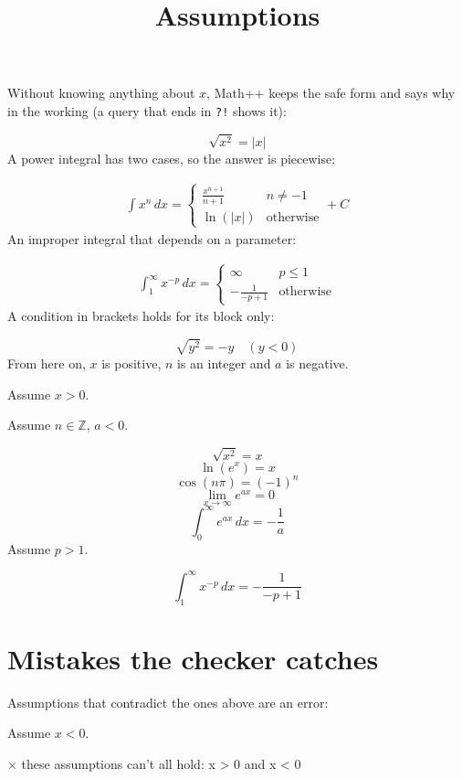 \documentclass[11pt,a4paper]{article}
\title{Assumptions}
\date{}
\theoremstyle{plain}
\theoremstyle{definition}
\theoremstyle{remark}
\begin{document}
\maketitle
Without knowing anything about $x$, Math++ keeps the safe form and says why in the working (a query that ends in \texttt{?!} shows it):

\begin{equation*}
  \sqrt{x^2} = \left|x\right|
\end{equation*}
A power integral has two cases, so the answer is piecewise:

\begin{align*}
  \int x^n \, dx = \begin{cases} \frac{x^{n + 1}}{n + 1} & n \neq -1 \\ \ln\left(\left|x\right|\right) & \text{otherwise} \end{cases} + C
\end{align*}
An improper integral that depends on a parameter:

\begin{align*}
  \int_1^\infty x^{-p} \, dx = \begin{cases} \infty & p \le 1 \\ -\frac{1}{-p + 1} & \text{otherwise} \end{cases}
\end{align*}
A condition in brackets holds for its block only:

\begin{equation*}
  \sqrt{y^2} = -y \quad (y < 0)
\end{equation*}
From here on, $x$ is positive, $n$ is an integer and $a$ is negative.

Assume $x > 0$.

Assume $n \in \mathbb{Z}$, $a < 0$.

\begin{equation*}
  \sqrt{x^2} = x
\end{equation*}
\begin{equation*}
  \ln(e^x) = x
\end{equation*}
\begin{equation*}
  \cos(n \pi) = \left(-1\right)^{n}
\end{equation*}
\begin{equation*}
  \lim_{x \to \infty} e^{a x} = 0
\end{equation*}
\begin{equation*}
  \int_0^\infty e^{a x} \, dx = -\frac{1}{a}
\end{equation*}
Assume $p > 1$.

\begin{equation*}
  \int_1^\infty x^{-p} \, dx = -\frac{1}{-p + 1}
\end{equation*}
\section*{Mistakes the checker catches}

Assumptions that contradict the ones above are an error:

Assume $x < 0$.

{\small\color{red!60!black}$\times$ these assumptions can't all hold: x > 0 and x < 0}
\end{document}
